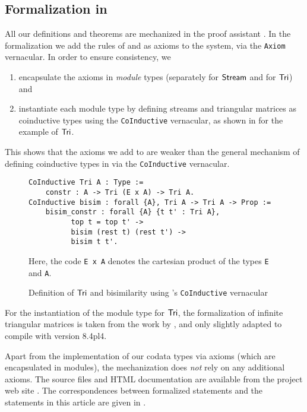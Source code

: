 \documentclass[a4paper,USenglish]{lipics}
\begin{document}
\begin{Long}
\section{Formalization in \coq}\label{sec:formal}

All our definitions and theorems are mechanized in the proof assistant \coq \parencite{coq84pl4}.
In the formalization we add the rules of  and  as axioms to the \coq system, via the \lstinline!Axiom! vernacular. In order to ensure consistency, we 
\begin{enumerate}
 \item encapsulate the axioms in \coq \emph{module} types (separately for $\mathsf{Stream}$ and for $\mathsf{Tri}$) and
 \item instantiate each module type by defining streams and triangular matrices as coinductive types using the \lstinline!CoInductive! vernacular,
  as shown in  for the example of $\mathsf{Tri}$.
\end{enumerate}
This shows that the axioms we add to \coq are weaker than the general mechanism of defining coinductive types in \coq via the \lstinline!CoInductive! vernacular.

\begin{figure}
 \begin{mdframed}
  \begin{lstlisting}
CoInductive Tri A : Type :=
    constr : A -> Tri (E x A) -> Tri A.
CoInductive bisim : forall {A}, Tri A -> Tri A -> Prop :=
    bisim_constr : forall {A} {t t' : Tri A}, 
          top t = top t' -> 
          bisim (rest t) (rest t') -> 
          bisim t t'.
\end{lstlisting}
Here, the code \lstinline!E x A! denotes the cartesian product of the types \lstinline!E! and \lstinline!A!.
 \end{mdframed}
 \caption{Definition of $\mathsf{Tri}$ and bisimilarity using \coq's \lstinline!CoInductive! vernacular} \label{tri_coinductive}
\end{figure}


For the instantiation of the module type for $\mathsf{Tri}$, the formalization of infinite triangular matrices is taken from the work by \textcite{DBLP:conf/types/MatthesP11},
and only slightly adapted to compile with \coq version 8.4pl4.

Apart from the implementation of our codata types via axioms (which are encapsulated in modules), the mechanization does \emph{not} rely on any additional axioms.
The \coq source files and HTML documentation are available from the project web site \parencite{trimat_coq}.
The correspondences between formalized statements and the statements in this article are given in .




\end{Long}
\end{document}
